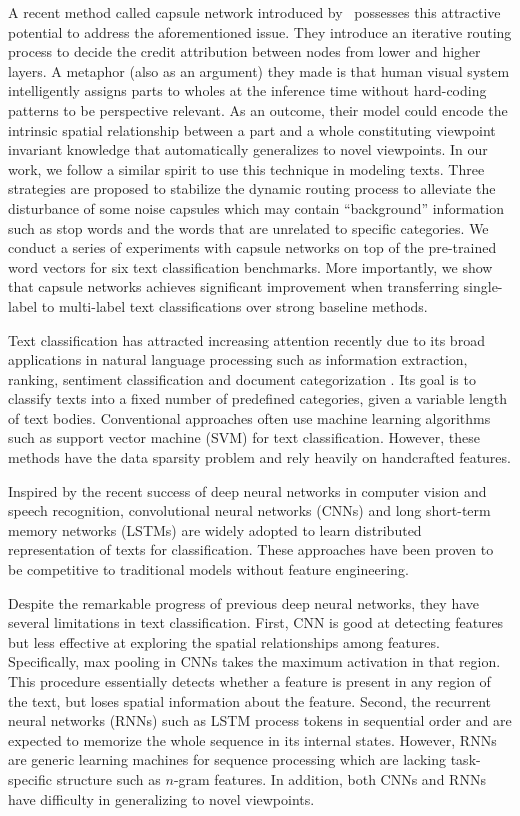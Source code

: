 \documentclass[11pt]{article}
\begin{document}
A recent method called capsule network introduced by~ possesses this attractive potential
to address the aforementioned issue. They introduce an iterative routing process to decide the credit attribution between nodes 
from lower and higher layers. A metaphor (also as an argument) they made is that human visual system intelligently assigns 
parts to wholes at the inference time without hard-coding patterns to be perspective relevant. As an outcome,
their model could encode the intrinsic spatial relationship between a part and a whole constituting viewpoint
invariant knowledge that automatically generalizes to novel viewpoints. 
In our work, we follow a similar spirit
to use this technique in modeling texts. 
Three strategies are proposed to stabilize the dynamic routing process to alleviate the disturbance of some noise capsules which may contain ``background'' information such as stop words and the words that are unrelated to specific categories.
We conduct a series of experiments with capsule networks on  top of the pre-trained word vectors for six text classification benchmarks. More importantly, we show that capsule networks 
achieves significant improvement when transferring single-label to multi-label text classifications over strong baseline methods.

\iffalse
Text classification has attracted increasing attention recently due to its broad applications in natural language processing such as information extraction, ranking, sentiment classification and document categorization \cite{allahyari2017brief}. Its goal is to classify texts into a fixed number of predefined categories, given a variable length of text bodies. Conventional approaches 
often use machine learning algorithms such as support vector machine (SVM) \cite{joachims1998text} for text classification. However, these methods have the data sparsity problem and rely heavily on handcrafted features.

Inspired by the recent success of deep neural networks in computer vision and speech recognition, convolutional neural networks (CNNs) and long short-term memory networks (LSTMs) are widely adopted to learn distributed representation of texts for classification. These approaches have been proven to be competitive to traditional models without feature engineering.

Despite the remarkable progress of previous deep neural networks, they have several limitations in text classification. 
First, CNN is good at detecting features but less effective at exploring the spatial relationships among features. Specifically, max pooling in CNNs takes the maximum activation in that region. This procedure essentially detects whether a feature is present in any region of the text, but loses spatial information about the feature. Second, the recurrent neural networks (RNNs) such as LSTM process tokens in sequential order and are expected to memorize the whole sequence in its internal states. However, RNNs are generic learning machines for sequence processing which are lacking task-specific structure such as $n$-gram features. In addition, both CNNs and RNNs have difficulty in generalizing to novel viewpoints. 
\end{document}
